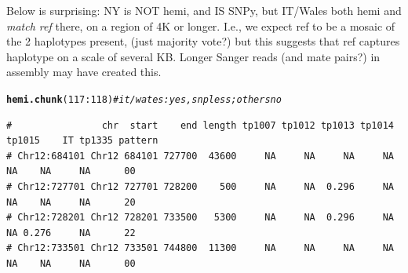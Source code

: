 \documentclass{article}\usepackage[]{graphicx}\usepackage[]{color}
\makeatletter
\newcommand{\hlnum}[1]{\textcolor[rgb]{0.686,0.059,0.569}{#1}}%
\newcommand{\hlcom}[1]{\textcolor[rgb]{0.678,0.584,0.686}{\textit{#1}}}%
\newcommand{\hlopt}[1]{\textcolor[rgb]{0,0,0}{#1}}%
\newcommand{\hlstd}[1]{\textcolor[rgb]{0.345,0.345,0.345}{#1}}%
\newcommand{\hlkwd}[1]{\textcolor[rgb]{0.737,0.353,0.396}{\textbf{#1}}}%
\newenvironment{kframe}{%
 \def\at@end@of@kframe{}%
 \ifinner\ifhmode%
  \def\at@end@of@kframe{\end{minipage}}%
  \begin{minipage}{\columnwidth}%
 \fi\fi%
 \def\FrameCommand##1{\hskip\@totalleftmargin \hskip-\fboxsep
 \colorbox{shadecolor}{##1}\hskip-\fboxsep
     \hskip-\linewidth \hskip-\@totalleftmargin \hskip\columnwidth}%
 \MakeFramed {\advance\hsize-\width
   \@totalleftmargin\z@ \linewidth\hsize
   \@setminipage}}%
 {\par\unskip\endMakeFramed%
 \at@end@of@kframe}
\newenvironment{knitrout}{}{} %
\makeatother
\begin{document}
Below is surprising:  NY is NOT hemi, and IS SNPy, but IT/Wales both hemi and \emph{match ref} there, on a region of 4K or longer.  I.e., we expect ref to be a mosaic of the 2 haplotypes present, (just majority vote?) but this suggests that ref captures haplotype on a scale of several KB.  Longer Sanger reads (and mate pairs?) in assembly may have created this.
\begin{knitrout}\footnotesize
{}\color{fgcolor}\begin{kframe}
\begin{alltt}
\hlkwd{hemi.chunk}\hlstd{(}\hlnum{117}\hlopt{:}\hlnum{118}\hlstd{)}\hlcom{# it/wates: yes, snpless; others no}
\end{alltt}
\begin{verbatim}
#                chr  start    end length tp1007 tp1012 tp1013 tp1014 tp1015    IT tp1335 pattern
# Chr12:684101 Chr12 684101 727700  43600     NA     NA     NA     NA     NA    NA     NA      00
# Chr12:727701 Chr12 727701 728200    500     NA     NA  0.296     NA     NA    NA     NA      20
# Chr12:728201 Chr12 728201 733500   5300     NA     NA  0.296     NA     NA 0.276     NA      22
# Chr12:733501 Chr12 733501 744800  11300     NA     NA     NA     NA     NA    NA     NA      00
\end{verbatim}
\end{kframe}


\end{knitrout}
\end{document}
